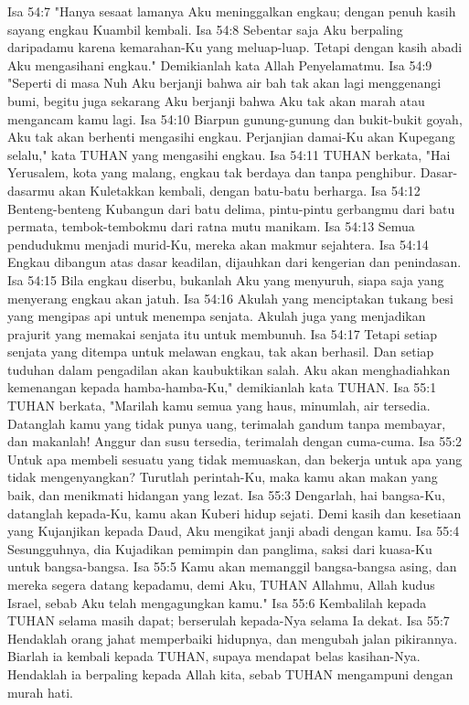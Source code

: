 Isa 54:7  "Hanya sesaat lamanya Aku meninggalkan engkau; dengan penuh kasih sayang engkau Kuambil kembali.
Isa 54:8  Sebentar saja Aku berpaling daripadamu karena kemarahan-Ku yang meluap-luap. Tetapi dengan kasih abadi Aku mengasihani engkau." Demikianlah kata Allah Penyelamatmu.
Isa 54:9  "Seperti di masa Nuh Aku berjanji bahwa air bah tak akan lagi menggenangi bumi, begitu juga sekarang Aku berjanji bahwa Aku tak akan marah atau mengancam kamu lagi.
Isa 54:10  Biarpun gunung-gunung dan bukit-bukit goyah, Aku tak akan berhenti mengasihi engkau. Perjanjian damai-Ku akan Kupegang selalu," kata TUHAN yang mengasihi engkau.
Isa 54:11  TUHAN berkata, "Hai Yerusalem, kota yang malang, engkau tak berdaya dan tanpa penghibur. Dasar-dasarmu akan Kuletakkan kembali, dengan batu-batu berharga.
Isa 54:12  Benteng-benteng Kubangun dari batu delima, pintu-pintu gerbangmu dari batu permata, tembok-tembokmu dari ratna mutu manikam.
Isa 54:13  Semua pendudukmu menjadi murid-Ku, mereka akan makmur sejahtera.
Isa 54:14  Engkau dibangun atas dasar keadilan, dijauhkan dari kengerian dan penindasan.
Isa 54:15  Bila engkau diserbu, bukanlah Aku yang menyuruh, siapa saja yang menyerang engkau akan jatuh.
Isa 54:16  Akulah yang menciptakan tukang besi yang mengipas api untuk menempa senjata. Akulah juga yang menjadikan prajurit yang memakai senjata itu untuk membunuh.
Isa 54:17  Tetapi setiap senjata yang ditempa untuk melawan engkau, tak akan berhasil. Dan setiap tuduhan dalam pengadilan akan kaubuktikan salah. Aku akan menghadiahkan kemenangan kepada hamba-hamba-Ku," demikianlah kata TUHAN.
Isa 55:1  TUHAN berkata, "Marilah kamu semua yang haus, minumlah, air tersedia. Datanglah kamu yang tidak punya uang, terimalah gandum tanpa membayar, dan makanlah! Anggur dan susu tersedia, terimalah dengan cuma-cuma.
Isa 55:2  Untuk apa membeli sesuatu yang tidak memuaskan, dan bekerja untuk apa yang tidak mengenyangkan? Turutlah perintah-Ku, maka kamu akan makan yang baik, dan menikmati hidangan yang lezat.
Isa 55:3  Dengarlah, hai bangsa-Ku, datanglah kepada-Ku, kamu akan Kuberi hidup sejati. Demi kasih dan kesetiaan yang Kujanjikan kepada Daud, Aku mengikat janji abadi dengan kamu.
Isa 55:4  Sesungguhnya, dia Kujadikan pemimpin dan panglima, saksi dari kuasa-Ku untuk bangsa-bangsa.
Isa 55:5  Kamu akan memanggil bangsa-bangsa asing, dan mereka segera datang kepadamu, demi Aku, TUHAN Allahmu, Allah kudus Israel, sebab Aku telah mengagungkan kamu."
Isa 55:6  Kembalilah kepada TUHAN selama masih dapat; berserulah kepada-Nya selama Ia dekat.
Isa 55:7  Hendaklah orang jahat memperbaiki hidupnya, dan mengubah jalan pikirannya. Biarlah ia kembali kepada TUHAN, supaya mendapat belas kasihan-Nya. Hendaklah ia berpaling kepada Allah kita, sebab TUHAN mengampuni dengan murah hati.

